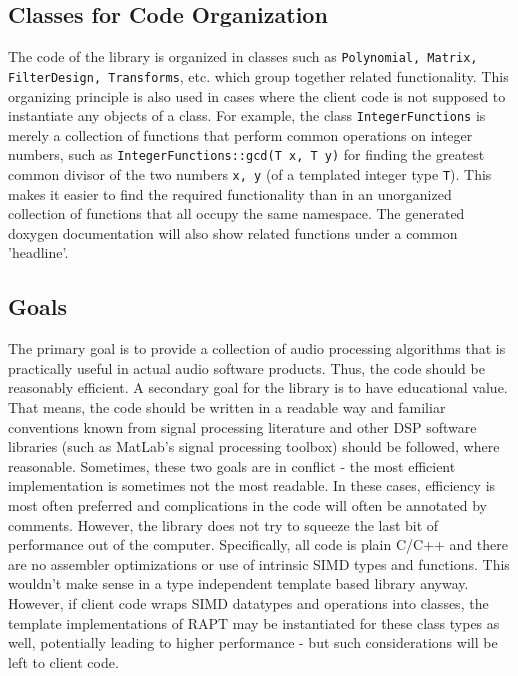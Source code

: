 \subsection{Classes for Code Organization}
The code of the library is organized in classes such as \texttt{Polynomial, Matrix, FilterDesign, Transforms}, etc. which group together related functionality. This organizing principle is also used in cases where the client code is not supposed to instantiate any objects of a class. For example, the class \texttt{IntegerFunctions} is merely a collection of functions that perform common operations on integer numbers, such as \texttt{IntegerFunctions::gcd(T x, T y)} for finding the greatest common divisor of the two numbers \texttt{x, y} (of a templated integer type \texttt{T}). This makes it easier to find the required functionality than in an unorganized collection of functions that all occupy the same namespace. The generated doxygen documentation will also show related functions under a common 'headline'.

\subsection{Goals}
The primary goal is to provide a collection of audio processing algorithms that is practically useful in actual audio software products. Thus, the code should be reasonably efficient. A secondary goal for the library is to have educational value. That means, the code should be written in a readable way and familiar conventions known from signal processing literature and other DSP software libraries (such as MatLab's signal processing toolbox) should be followed, where reasonable. Sometimes, these two goals are in conflict - the most efficient implementation is sometimes not the most readable. In these cases, efficiency is most often preferred and complications in the code will often be annotated by comments. However, the library does not try to squeeze the last bit of performance out of the computer. Specifically, all code is plain C/C++ and there are no assembler optimizations or use of intrinsic SIMD types and functions. This wouldn't make sense in a type independent template based library anyway. However, if client code wraps SIMD datatypes and operations into classes, the template implementations of RAPT may be instantiated for these class types as well, potentially leading to higher performance - but such considerations will be left to client code.


